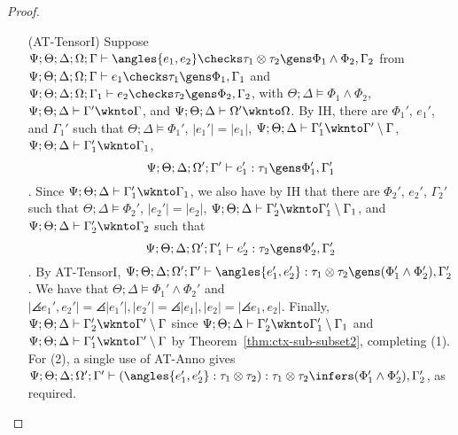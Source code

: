 \begin{proof}
\begin{itemize}
  
  \item[(AT-TensorI)] Suppose $\Psi ; \Theta ; \Delta ; \Omega ; \Gamma\vdash \angles{e_1,e_2} \checks \tau_1 \otimes \tau_2 \gens \Phi_1 \wedge \Phi_2,\Gamma_2$
  from $\Psi ; \Theta ; \Delta ; \Omega ; \Gamma\vdash e_1 \checks \tau_1 \gens \Phi_1, \Gamma_1$ and $\Psi ; \Theta ; \Delta ; \Omega ; \Gamma_1\vdash e_2 \checks \tau_2 \gens \Phi_2, \Gamma_2$, with $\Theta ; \Delta \vDash \Phi_1 \wedge \Phi_2$, $\Psi ; \Theta ; \Delta \vdash \Gamma' \wknto \Gamma$, and $\Psi ; \Theta ; \Delta \vdash \Omega' \wknto \Omega$. By IH, there are $\Phi_1'$, $e_1'$, and $\Gamma_1'$ such that
  $\Theta ; \Delta \vDash \Phi_1'$,
  $|e_1'| = |e_1|$,
  $\Psi ; \Theta ; \Delta \vdash \Gamma_1' \wknto \Gamma' \setminus \Gamma$,
  $\Psi ; \Theta ; \Delta \vdash \Gamma_1' \wknto \Gamma_1$,
  $$\Psi ; \Theta ; \Delta ; \Omega' ; \Gamma' \vdash e_1' : \tau_1 \gens \Phi_1', \Gamma_1'$$.
  Since $\Psi ; \Theta ; \Delta \vdash \Gamma_1' \wknto \Gamma_1$, we also have by IH that there are $\Phi_2'$, $e_2'$, $\Gamma_2'$ such that
  $\Theta ; \Delta \vDash \Phi_2'$,
  $|e_2'| = |e_2|$,
  $\Psi ; \Theta ; \Delta \vdash \Gamma_2' \wknto \Gamma_1' \setminus \Gamma_1$, and
  $\Psi ; \Theta ; \Delta \vdash \Gamma_2' \wknto \Gamma_2$
  such that
  $$\Psi ; \Theta ; \Delta ; \Omega' ; \Gamma_1' \vdash e_2' : \tau_2 \gens \Phi_2',\Gamma_2'$$.
  By AT-TensorI, $\Psi ; \Theta ; \Delta ; \Omega' ; \Gamma' \vdash \angles{e_1',e_2'} : \tau_1 \otimes \tau_2 \gens (\Phi_1' \wedge \Phi_2'), \Gamma_2'$.
  We have that $\Theta ; \Delta \vDash \Phi_1' \wedge \Phi_2'$ and $|\angles{e_1',e_2'}| = \angles{|e_1'|,|e_2'|} = \angles{|e_1|,|e_2|} = |\angles{e_1,e_2}|$.
  Finally, $\Psi ; \Theta ; \Delta \vdash \Gamma_2' \wknto \Gamma' \setminus \Gamma$ since $\Psi ; \Theta ; \Delta \vdash \Gamma_2' \wknto \Gamma_1' \setminus \Gamma_1$ and $\Psi ; \Theta ; \Delta \vdash \Gamma_1' \wknto \Gamma' \setminus \Gamma$ by Theorem~\ref{thm:ctx-sub-subset2}, completing (1). For (2), a single use of
  AT-Anno gives  $\Psi ; \Theta ; \Delta ; \Omega' ; \Gamma' \vdash (\angles{e_1',e_2'} : \tau_1 \otimes \tau_2) : \tau_1 \otimes \tau_2 \infers (\Phi_1' \wedge \Phi_2'), \Gamma_2'$, as required.
  

\end{itemize}
\end{proof}
